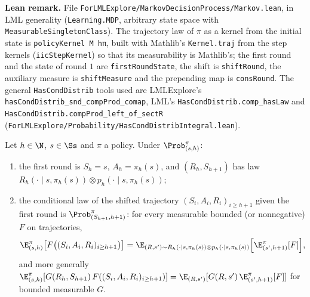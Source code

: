 \textbf{Lean remark.} File \texttt{ForLMLExplore/MarkovDecisionProcess/Markov.lean}, in LML generality (\texttt{Learning.MDP},
arbitrary state space with \texttt{MeasurableSingletonClass}). The trajectory law of $\pi$ as a
kernel from the initial state is \texttt{policyKernel M hπ}, built with Mathlib's
\texttt{Kernel.traj} from the step kernels (\texttt{iicStepKernel}) so that its measurability
is Mathlib's; the first round and the state of round $1$ are
\texttt{firstRoundState}, the shift is \texttt{shiftRound}, the auxiliary measure is
\texttt{shiftMeasure} and the prepending map is \texttt{consRound}. The general
\texttt{HasCondDistrib} tools used are LMLExplore's \texttt{hasCondDistrib\_snd\_compProd\_comap},
LML's \texttt{HasCondDistrib.comp\_hasLaw} and \texttt{HasCondDistrib.compProd\_left\_of\_sectR}
(\texttt{ForLMLExplore/Probability/HasCondDistribIntegral.lean}).

\begin{lemma}\label{lem:step_law_markov}
\leanok
{}
Let $h \in \N$, $s \in \Ss$ and $\pi$ a policy. Under $\Prob^\pi_{(s, h)}$:
\begin{enumerate}
  \item[(i)] the first round is $S_h = s$, $A_h = \pi_h(s)$, and $(R_h, S_{h+1})$ has law
        $R_h(\cdot \mid s, \pi_h(s)) \otimes p_h(\cdot \mid s, \pi_h(s))$;
  \item[(ii)] the conditional law of the shifted trajectory $(S_i, A_i, R_i)_{i \ge h+1}$ given
        the first round is $\Prob^\pi_{(S_{h+1}, h + 1)}$: for every measurable bounded (or
        nonnegative) $F$ on trajectories,
        \[
          \E^\pi_{(s, h)}\big[F\big((S_i, A_i, R_i)_{i \ge h + 1}\big)\big]
          = \E_{(R, s') \sim R_h(\cdot \mid s, \pi_h(s)) \otimes p_h(\cdot \mid s, \pi_h(s))}
            \Big[ \E^\pi_{(s', h + 1)}[F] \Big],
        \]
        and more generally
        $\E^\pi_{(s, h)}[G(R_h, S_{h+1})\, F((S_i, A_i, R_i)_{i \ge h+1})]
        = \E_{(R, s')}[G(R, s')\, \E^\pi_{(s', h+1)}[F]]$ for bounded measurable $G$.
\end{enumerate}
\end{lemma}

